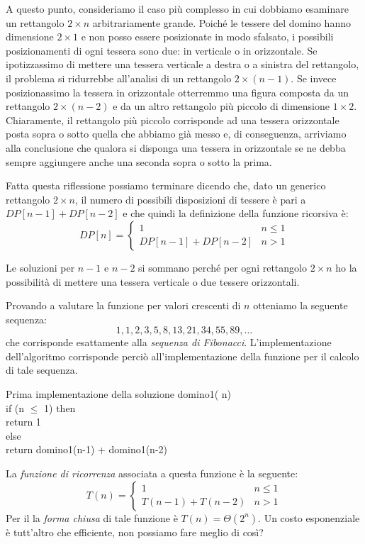 A questo punto, consideriamo il caso più complesso in cui dobbiamo esaminare un
rettangolo $2\times n$ arbitrariamente grande. Poiché le tessere del domino hanno
dimensione $2\times1$ e non posso essere posizionate in modo sfalsato, i
possibili posizionamenti di ogni tessera sono due: in verticale o in orizzontale.
Se ipotizzassimo di mettere una tessera verticale a destra o a sinistra del
rettangolo, il problema si ridurrebbe all'analisi di un rettangolo $2\times(n-1)$.
Se invece posizionassimo la tessera in orizzontale otterremmo una figura composta
da un rettangolo $2\times(n-2)$ e da un altro rettangolo più piccolo di
dimensione $1\times2$. Chiaramente, il rettangolo più piccolo corrisponde ad una
tessera orizzontale posta sopra o sotto quella che abbiamo già messo e, di
conseguenza, arriviamo alla conclusione che qualora si disponga una tessera in
orizzontale se ne debba sempre aggiungere anche una seconda sopra o sotto la prima.

\noindent
Fatta questa riflessione possiamo terminare dicendo che, dato un
generico rettangolo $2\times n$, il numero di possibili disposizioni di tessere
è pari a $DP[n-1]+DP[n-2]$ e che quindi la definizione della funzione ricorsiva
è:
\[DP[n]=\begin{cases}
    1 & n\leq1\\
    DP[n-1]+DP[n-2] & n>1
\end{cases}\]
\begin{note}
    Le soluzioni per $n-1$ e $n-2$ si sommano perché per ogni rettangolo $2\times
    n$ ho la possibilità di mettere una tessera verticale o due tessere orizzontali.
\end{note}

\bigskip\noindent
Provando a valutare la funzione per valori crescenti di $n$ otteniamo la
seguente sequenza:
\[1,1,2,3,5,8,13,21,34,55,89,\dots\]
che corrisponde esattamente alla \emph{sequenza di Fibonacci}. L'implementazione
dell'algoritmo corrisponde perciò all'implementazione della funzione per il
calcolo di tale sequenza.

\begin{minicode}{Prima implementazione della soluzione}
    \ind{} domino1( n)\\
        \indf if (n $\leq$ 1) then\\
            return 1\\
        \indf else\\
            return domino1(n-1) + domino1(n-2)
\end{minicode}\noindent
La \emph{funzione di ricorrenza} associata a questa funzione è la seguente:
\[T(n)=\begin{cases}
    1 & n\leq1\\
    T(n-1)+T(n-2) & n>1
\end{cases}\]
Per il \emph{} la \emph{forma chiusa} di tale funzione è
$T(n)=\Theta(2^n)$. Un costo esponenziale è tutt'altro che efficiente, non
possiamo fare meglio di così?

